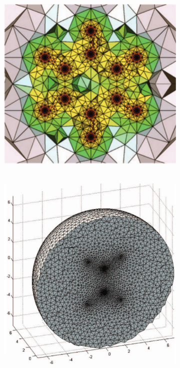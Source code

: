 \begin{figure}
\begin{subfigure}{0.28\textwidth}
   \vspace{-43mm}\caption{$\qquad\qquad\qquad\qquad\quad$}
   \label{fig:HexDia}
  \end{subfigure}
  \begin{subfigure}{0.23\textwidth}
   \includegraphics[width=\textwidth]{Figures/PolyBenzene}
   \vspace{-42mm}\caption{$\quad\qquad\qquad\qquad\quad$}
   \label{fig:PolyBenz}
  \end{subfigure}
  \begin{subfigure}{0.23\textwidth}
   \includegraphics[width=\textwidth]{Figures/AdaptiveEthylene}

\end{subfigure}
\end{figure}
